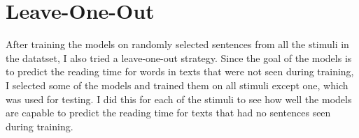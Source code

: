 \section{Leave-One-Out}
After training the models on randomly selected sentences from all the stimuli in the datatset, I also tried a leave-one-out strategy. Since the goal of the models is to predict the reading time for words in texts that were not seen during training, I selected some of the models and trained them on all stimuli except one, which was used for testing. I did this for each of the stimuli to see how well the models are capable to predict the reading time for texts that had no sentences seen during training.